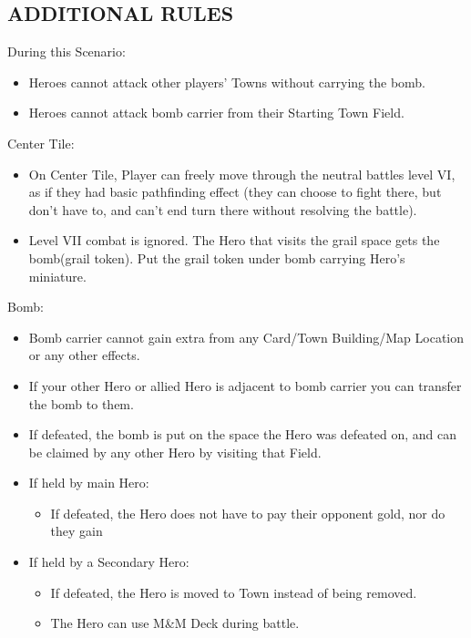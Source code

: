 \begin{multicols}{2}
\newpage

\subsection*{\MakeUppercase{Additional Rules}}

During this Scenario:

\begin{itemize}
  \item Heroes cannot attack other players' Towns without carrying the bomb.
  \item Heroes cannot attack bomb carrier from their Starting Town Field.
\end{itemize}

Center Tile:
\begin{itemize}
  \item On Center Tile, Player can freely move through the neutral battles level VI, as if they had basic pathfinding effect (they can choose to fight there, but don't have to, and can't end turn there without resolving the battle).
  \item Level VII combat is ignored. The Hero that visits the grail space gets the bomb(grail token). Put the grail token under bomb carrying Hero's miniature.
\end{itemize}

Bomb:

\begin{itemize}
  \item Bomb carrier cannot gain extra  from any Card/Town Building/Map Location or any other effects.
  \item If your other Hero or allied Hero is adjacent to bomb carrier you can transfer the bomb to them.
  \item If defeated, the bomb is put on the space the Hero was defeated on, and can be claimed by any other Hero by visiting that Field.
  \item If held by main Hero:
  \begin{itemize}
    \item If defeated, the Hero does not have to pay their opponent gold, nor do they gain 
  \end{itemize}
  \item If held by a Secondary Hero:
  \begin{itemize}
    \item If defeated, the Hero is moved to Town instead of being removed.
    \item The Hero can use M\&M Deck during battle.
  \end{itemize}
\end{itemize}


\end{multicols}
